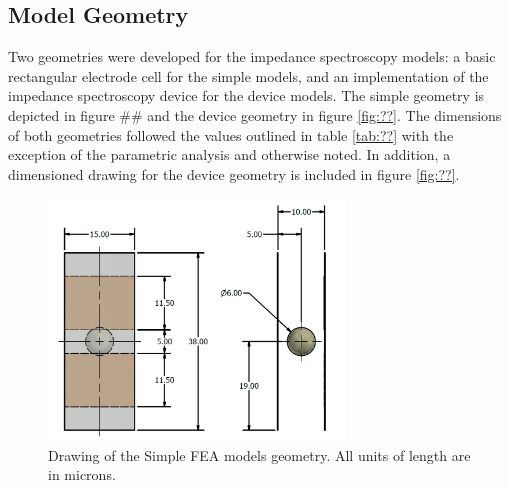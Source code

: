 \subsection*{Model Geometry}
\par Two geometries were developed for the impedance spectroscopy models: a basic rectangular electrode cell for the simple models, and an implementation of the impedance spectroscopy device for the device models. The simple geometry is depicted in figure ## and the device geometry in figure \ref{fig:??}. The dimensions of both geometries followed the values outlined in table \ref{tab:??} with the exception of the parametric analysis and otherwise noted. In addition, a dimensioned drawing for the device geometry is included in figure \ref{fig:??}.

\begin{figure}
    \centering
    \includegraphics[width=0.7\textwidth]{images/simple_cell_drawing_inventor.png}
    \caption[Simple FEA model geometry.]{Drawing of the Simple FEA models geometry. All units of length are in microns.}
    \label{fig:simple_model_geometry}
\end{figure}


